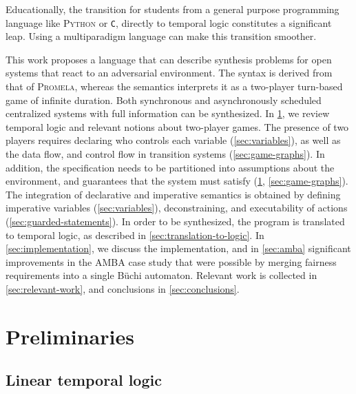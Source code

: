 \documentclass[copyright]{eptcs}
\begin{document}
Educationally, the transition for students from a general purpose programming language like \textsc{Python} or \texttt{C}, directly to temporal logic constitutes a significant leap.
Using a multiparadigm language can make this transition smoother.




This work proposes a language that can describe synthesis problems for open systems that react to an adversarial environment.
The syntax is derived from that of \textsc{Promela}, whereas the semantics interprets it as a two-player turn-based game of infinite duration.
Both synchronous and asynchronously scheduled centralized systems with full information can be synthesized.
In \cref{sec:preliminaries}, we review temporal logic and relevant notions about two-player games.
The presence of two players requires declaring who controls each variable (\cref{sec:variables}), as well as the data flow, and control flow in transition systems (\cref{sec:game-graphs}).
In addition, the specification needs to be partitioned into assumptions about the environment, and guarantees that the system must satisfy (\cref{sec:preliminaries}, \cref{sec:game-graphs}).
The integration of declarative and imperative semantics is obtained by defining imperative variables (\cref{sec:variables}), deconstraining, and executability of actions (\cref{sec:guarded-statements}).
In order to be synthesized, the program is translated to temporal logic, as described in \cref{sec:translation-to-logic}.
In \cref{sec:implementation}, we discuss the implementation, and in \cref{sec:amba} significant improvements in the AMBA case study \cite{Bloem12jcss} that were possible by merging fairness requirements into a single B\"{u}chi automaton.
Relevant work is collected in \cref{sec:relevant-work}, and conclusions in \cref{sec:conclusions}.
\clearpage{}
\clearpage{}\section{Preliminaries}
\label{sec:preliminaries}

\subsection{Linear temporal logic}
\end{document}
